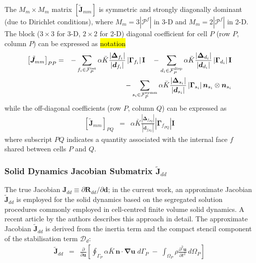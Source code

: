 \documentclass[sn-mathphys,Numbered]{sn-jnl}%
\newcommand{\bb}{\boldsymbol}
\begin{document}
The $M_m \times M_m$ matrix $\left[ \bb{\tilde{J}}_{mm} \right]$ is symmetric and strongly diagonally dominant (due to Dirichlet conditions), where $M_m = 3|\mathcal{P}^f|$ in 3-D and $M_m = 2|\mathcal{P}^f|$ in 2-D.
The block ($3\times3$ for 3-D, $2\times2$ for 2-D) diagonal coefficient for cell $P$ (row $P$, column $P$) can be expressed as \hl{notation}
\begin{eqnarray}
	 \left[ \tilde{\bb{J}}_{mm} \right]_{PP} &=&
		- \sum_{f_i \in \mathcal{F}^{\text{int}}_P}  \alpha \bar{K}
		\frac{ \left|\bb{\Delta}_{f_i} \right| }{\left|\bb{d}_{f_i}\right|}    \left|\bb{\Gamma}_{f_i}\right| \textbf{I} 
	    \quad-  \sum_{d_i \in \mathcal{F}^{\text{disp}}_P}  \alpha \bar{K}
		 \frac{ \left|\bb{\Delta}_{d_i} \right| }{\left|\bb{d}_{d_i}\right|} 
		\left|\bb{\Gamma}_{d_i}\right| \textbf{I} \notag \\
	 &&\quad - \sum_{s_i \in \mathcal{F}^{\text{symm}}_P} \alpha \bar{K}
		 \frac{ \left|\bb{\Delta}_{s_i} \right|}{\left|\bb{d}_{s_i}\right|}
		\left|\bb{\Gamma}_{s_i}\right|  \bb{n}_{s_i} \otimes \bb{n}_{s_i}
\end{eqnarray}
while the off-diagonal coefficients (row $P$, column $Q$) can be expressed as
\begin{eqnarray}
	\left[\tilde{\bb{J}}_{mm} \right] _{PQ} &=&
		\alpha \bar{K} \frac{ \left|\bb{\Delta}_{f_{PQ}} \right| }{\left|\bb{d}_{f_{PQ}}\right|} \left|\bb{\Gamma}_{f_{PQ}}\right| \textbf{I} 
\end{eqnarray}
where subscript $PQ$ indicates a quantity associated with the internal face $f$ shared between cells $P$ and $Q$.



\subsubsection[Solid Dynamics Jacobian Submatrices]{Solid Dynamics Jacobian Submatrix $\tilde{\bb{J}}_{dd}$}
The true Jacobian $\bb{J}_{dd} \equiv \partial \bb{R}_{dd}/\partial \bb{d}$; in the current work, an approximate Jacobian $\tilde{\bb{J}}_{dd}$ is employed for the solid dynamics based on the segregated solution procedures commonly employed in cell-centred finite volume solid dynamics.
A recent article \citep{Cardiff2025jfnk} by the authors describes this approach in detail.
The approximate Jacobian $\tilde{\bb{J}}_{dd}$ is derived from the inertia term and the compact stencil component of the stabilisation term $\bb{\mathcal{D}}_d$:
\begin{eqnarray}
	\tilde{\bb{J}}_{dd}
	&=&
	\frac{\partial}{\partial \bb{u}} \left[ \oint_{\Gamma_P} \alpha \bar{K} \, \bb{n} \cdot \bb{\nabla} \bb{u} \; d\Gamma_P
	 \; -\;  \int_{\Omega_P} \rho \frac{\partial^2 \bb{u} }{\partial t^2} \, d\Omega_P \right]
\end{eqnarray}
\end{document}
